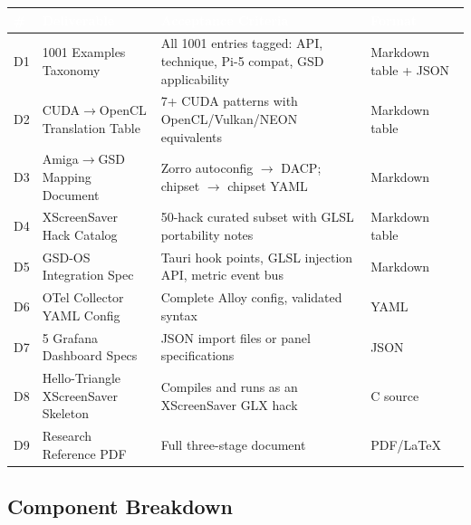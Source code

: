 \documentclass[11pt,letterpaper]{article}
\newcommand{\tableheader}[1]{\textbf{\sffamily\textcolor{white}{#1}}}
\begin{document}
\begin{center}
\begin{tabularx}{\textwidth}{C{0.5cm}L{4.5cm}XC{2.5cm}}
\toprule
{}
\tableheader{\#} & \tableheader{Deliverable} & \tableheader{Acceptance Criteria} & \tableheader{Format} \\
\midrule
D1 & 1001 Examples Taxonomy & All 1001 entries tagged: API, technique, Pi-5 compat, GSD applicability & Markdown table + JSON \\
D2 & CUDA$\to$OpenCL Translation Table & 7+ CUDA patterns with OpenCL/Vulkan/NEON equivalents & Markdown table \\
D3 & Amiga$\to$GSD Mapping Document & Zorro autoconfig $\to$ DACP; chipset $\to$ chipset YAML & Markdown \\
D4 & XScreenSaver Hack Catalog & 50-hack curated subset with GLSL portability notes & Markdown table \\
D5 & GSD-OS Integration Spec & Tauri hook points, GLSL injection API, metric event bus & Markdown \\
D6 & OTel Collector YAML Config & Complete Alloy config, validated syntax & YAML \\
D7 & 5 Grafana Dashboard Specs & JSON import files or panel specifications & JSON \\
D8 & Hello-Triangle XScreenSaver Skeleton & Compiles and runs as an XScreenSaver GLX hack & C source \\
D9 & Research Reference PDF & Full three-stage document & PDF/LaTeX \\
\bottomrule
\end{tabularx}
\end{center}

\subsection{Component Breakdown}
\end{document}
